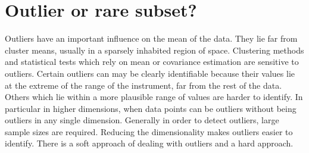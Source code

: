 

\section{ Outlier or rare subset? }

Outliers have an important influence on the mean of the data.
They lie far from cluster means, usually in a sparsely inhabited region of space.
Clustering methods and statistical tests which rely on mean or covariance estimation are sensitive to outliers.
Certain outliers can may be clearly identifiable because their values lie at the extreme of the range of the instrument, far from the rest of the data.
Others which lie within a more plausible range of values are harder to identify.
In particular in higher dimensions, when data points can be outliers without being outliers in any single dimension.
Generally in order to detect outliers, large sample sizes are required.
Reducing the dimensionality makes outliers easier to identify.
There is a soft approach of dealing with outliers and a hard approach.


